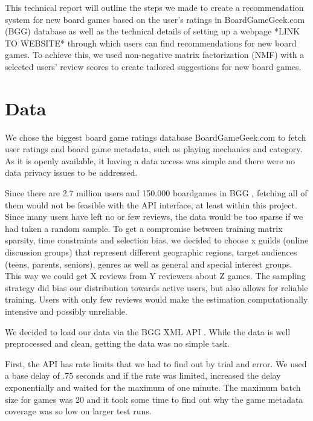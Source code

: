 \documentclass[a4paper,12pt,bibliography=totoc,numbers=noenddot,sfdefaults=false,abstract=true,notitlepage]{scrartcl} %
\begin{document}
	This technical report will outline the steps we made to create a recommendation system for new board games based on the user's ratings in BoardGameGeek.com (BGG) database as well as the technical details of setting up a webpage *LINK TO WEBSITE* through which users can find recommendations for new board games. To achieve this, we used non-negative matrix factorization (NMF) with a selected users' review scores to create tailored suggestions for new board games.
	
	
	
	
	\section{Data}\label{data}

	We chose the biggest board game ratings database BoardGameGeek.com to fetch user ratings and board game metadata, such as playing mechanics and category. As it is openly available, it having a data access was simple and there were no data privacy issues to be addressed.

	Since there are 2.7 million users  and 150.000 boardgames in BGG \autocite{didymus-trueBoardGameGeeksSupportDrive2024,wordsratedBoardGamesStatistics2025}, fetching all of them would not be feasible with the API interface, at least within this project. Since many users have left no or few reviews, the data would be too sparse if we had taken a random sample. To get a compromise between training matrix sparsity, time constraints and selection bias, we decided to choose x guilds (online discussion groups) that represent different geographic regions, target audiences (teens, parents, seniors), genres as well as general and special interest groups. This way we could get X reviews from Y reviewers about Z games. The sampling strategy did bias our distribution towards active users, but also allows for reliable training. Users with only few reviews would make the estimation computationally intensive and possibly unreliable.
	
	We decided to load our data via the BGG XML API \autocite{bbgBGGXMLAPI22025}. While the data is well preprocessed and clean, getting the data was no simple task.

	First, the API has rate limits that we had to find out by trial and error. We used a base delay of .75 seconds and if the rate was limited, increased the delay exponentially and waited for the maximum of one minute. The maximum batch size for games was 20 and it took some time to find out why the game metadata coverage was so low on larger test runs.
\end{document}

